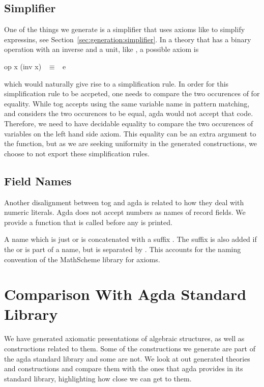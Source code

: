 \subsection{Simplifier}
One of the things we generate is a simplifier that uses axioms like  to simplify expressins, see Section~\ref{sec:generation:simplifier}. 
In a theory that has a binary operation with an inverse and a unit, like , a possible axiom is  
\begin{agdacode}
op x (inv x) ~$\equiv$~ e 
\end{agdacode}
which would naturally give rise to a simplification rule. In order for this simplification rule to be accpeted, one needs to compare the two occurences of  for equality. While tog accepts using the same variable name in pattern matching, and considers the two occurences to be equal, agda would not accept that code. Therefore, we need to have decidable equality to compare the two occurences of variables on the left hand side axiom. This equality can be an extra argument to the function, but as we are seeking uniformity in the generated constructions, we choose to not export these simplification rules. 

\subsection{Field Names}
Another disalignment between tog and agda is related to how they deal with numeric literals. Agda does not accept numbers as names of record fields. 
We provide a function  that is called before any  is printed. 
A name which is just  or  is concatenated with a suffix . The suffix is also added if the  or  is part of a name, but is separated by \lstmath{_}. This accounts for the naming convention of the MathScheme library for axioms. 

\section{Comparison With Agda Standard Library}
\label{sec:compasion_agda_stdlib}
We have generated axiomatic presentations of algebraic structures, as well as constructions related to them. Some of the constructions we generate are part of the agda standard library and some are not. We look at out generated theories and constructions and compare them with the ones that agda provides in its standard library, highlighting how close we can get to them. 

